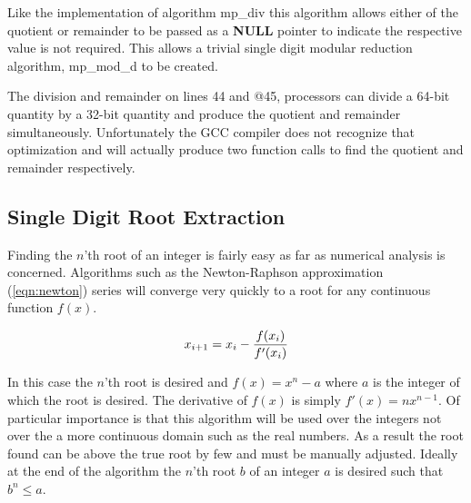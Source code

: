 \documentclass[b5paper]{book}
\begin{document}
Like the implementation of algorithm mp\_div this algorithm allows either of the quotient or remainder to be passed as a \textbf{NULL} pointer to
indicate the respective value is not required.  This allows a trivial single digit modular reduction algorithm, mp\_mod\_d to be created.

The division and remainder on lines 44 and @45,%
processors can divide a 64-bit quantity by a 32-bit quantity and produce the quotient and remainder simultaneously.  Unfortunately the GCC 
compiler does not recognize that optimization and will actually produce two function calls to find the quotient and remainder respectively.  

\subsection{Single Digit Root Extraction}

Finding the $n$'th root of an integer is fairly easy as far as numerical analysis is concerned.  Algorithms such as the Newton-Raphson approximation 
(\ref{eqn:newton}) series will converge very quickly to a root for any continuous function $f(x)$.  

\begin{equation}
x_{i+1} = x_i - {f(x_i) \over f'(x_i)}
\label{eqn:newton}
\end{equation}

In this case the $n$'th root is desired and $f(x) = x^n - a$ where $a$ is the integer of which the root is desired.  The derivative of $f(x)$ is 
simply $f'(x) = nx^{n - 1}$.  Of particular importance is that this algorithm will be used over the integers not over the a more continuous domain
such as the real numbers.  As a result the root found can be above the true root by few and must be manually adjusted.  Ideally at the end of the 
algorithm the $n$'th root $b$ of an integer $a$ is desired such that $b^n \le a$.  
\end{document}
